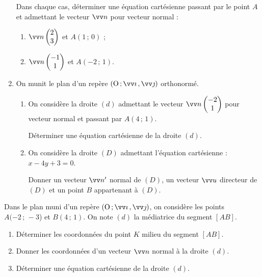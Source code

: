 \documentclass[a4paper,11pt]{article}
\begin{document}
\begin{enumerate}
	Dans chaque cas, déterminer une équation cartésienne passant par le point $A$ et admettant le vecteur $\vect{n}$ pour vecteur normal :
	\begin{multicols}{2}
		\begin{enumerate}
			\item $\vect{n} \begin{pmatrix}2\\3\end{pmatrix}$ et $A(1\,;\,0)$ ;
			\item $\vect{n} \begin{pmatrix}-1\\1\end{pmatrix}$ et $A(-2\,;\,1)$.
		\end{enumerate}
	\end{multicols}
	\item On munit le plan d’un repère $\Rij$ orthonormé.
	\begin{enumerate}
		\item On considère la droite $(d)$ admettant le vecteur $\vect{n} \begin{pmatrix}-2\\1\end{pmatrix}$ pour vecteur normal et passant par  $A(4\,;\,1)$.
		
		Déterminer une équation cartésienne de la droite $(d)$.
		\item On considère la droite $(D)$ admettant l’équation cartésienne : $x - 4y + 3 = 0$.
		
		Donner un vecteur $\vect{n'}$ normal de $(D)$, un vecteur $\vect{u}$ directeur de $(D)$ et un point $B$ appartenant à $(D)$.
	\end{enumerate}
\end{enumerate}

\pagebreak


\medskip

Dans le plan muni d’un repère $\Rij$, on considère les points $A(-2\,;\,-3$) et $B(4\,;\,1)$. On note $(d)$ la médiatrice du segment $[AB]$.

\begin{enumerate}
	\item Déterminer les coordonnées du point $K$ milieu du segment $[AB]$.
	\item Donner les coordonnées d’un vecteur $\vect{n}$ normal à la droite $(d)$.
	\item Déterminer une équation cartésienne de la droite $(d)$.
\end{enumerate}
\end{document}
